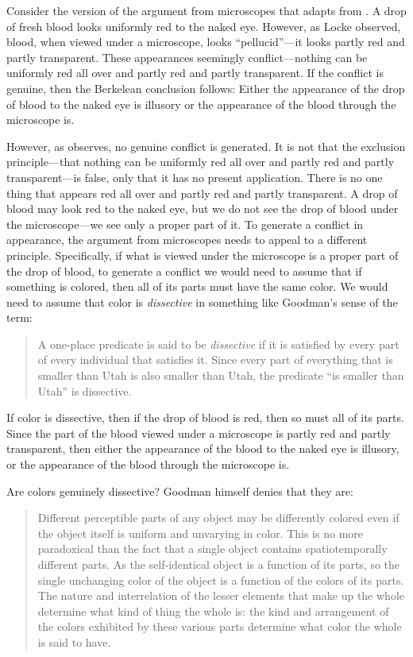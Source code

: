 \documentclass[12pt]{article}
\begin{document}
Consider the version of the argument from microscopes that \citet{Hilbert:1987jq} adapts from \citet{Marc-Wogau:1968kx}. A drop of fresh blood looks uniformly red to the naked eye. However, as Locke observed, blood, when viewed under a microscope, looks ``pellucid''---it looks partly red and partly transparent. These appearances seemingly conflict---nothing can be uniformly red all over and partly red and partly transparent. If the conflict is genuine, then the Berkelean conclusion follows: Either the appearance of the drop of blood to the naked eye is illusory or the appearance of the blood through the microscope is. 

However, as \citet{Hilbert:1987jq} observes, no genuine conflict is generated. It is not that the exclusion principle---that nothing can be uniformly red all over and partly red and partly transparent---is false, only that it has no present application. There is no one thing that appears red all over and partly red and partly transparent. A drop of blood may look red to the naked eye, but we do not see the drop of blood under the microscope---we see only a proper part of it. To generate a conflict in appearance, the argument from microscopes needs to appeal to a different principle. Specifically, if what is viewed under the microscope is a proper part of the drop of blood, to generate a conflict we would need to assume that if something is colored, then all of its parts must have the same color. We would need to assume that color is \emph{dissective} in something like Goodman's sense of the term:
\begin{quote}
	A one-place predicate is said to be \emph{dissective} if it is satisfied by every part of every individual that satisfies it. Since every part of everything that is smaller than Utah is also smaller than Utah, the predicate ``is smaller than Utah'' is dissective. \citep[53]{Goodman:1951ww}
\end{quote}
If color is dissective, then if the drop of blood is red, then so must all of its parts. Since the part of the blood viewed under a microscope is partly red and partly transparent, then either the appearance of the blood to the naked eye is illusory, or the appearance of the blood through the microscope is.

Are colors genuinely dissective? Goodman himself denies that they are:
\begin{quote}
	Different perceptible parts of any object may be differently colored even if the object itself is uniform and unvarying in color. This is no more paradoxical than the fact that a single object contains spatiotemporally different parts. As the self-identical object is a function of its parts, so the single unchanging color of the object is a function of the colors of its parts. The nature and interrelation of the lesser elements that make up the whole determine what kind of thing the whole is: the kind and arrangement of the colors exhibited by these various parts determine what color the whole is said to have. \citep[130]{Goodman:1951ww}
\end{quote}
\end{document}
